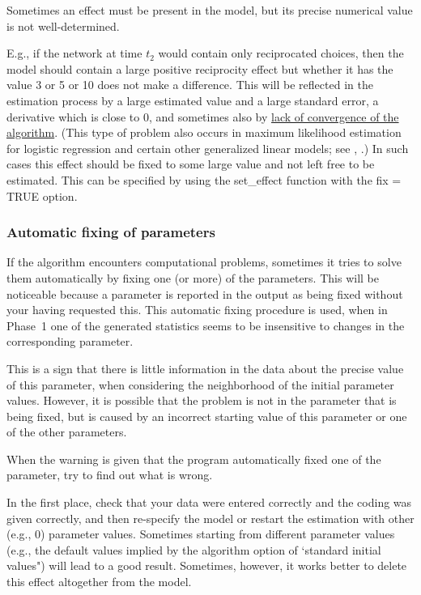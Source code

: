 \documentclass[a4paper,fleqn,11pt]{article}
\newcommand{\+}{\, + \,}
\begin{document}
\hypertarget{T_fix}{Sometimes an effect must be present in the
model, but its precise numerical value is not well-determined.}
E.g., if the network at time $t_2$ would contain only reciprocated
choices, then the model should contain a large positive
reciprocity effect but whether it has the value 3 or 5 or 10 does
not make a difference. This will be reflected in the estimation
process by a large estimated value and a large standard error, a
derivative which is close to 0, and sometimes also by
\hyperlink{T_convergence}{lack of convergence of the algorithm}.
(This type of problem also occurs in maximum likelihood estimation
for logistic regression and certain other generalized linear
models; \label{LargeFix} see \citet[section 1.6]{GeyerThompson92},
\citet{AlbertAnderson84, HauckDonner77}.)
In such cases this effect
should be fixed to some large value and not left free to be
estimated. This can be specified
by using the \textsf{set\_effect} function with the
\textsf{fix = TRUE} option.



\subsubsection{Automatic fixing of parameters}
\label{S_fixing}

If the algorithm encounters computational
problems, sometimes it tries to solve them automatically by fixing
one (or more) of the parameters. This will be noticeable because a
parameter is reported in the output as being fixed without your
having requested this. This automatic fixing procedure is used,
when in Phase~1 one of the generated statistics seems to be
insensitive to changes in the corresponding parameter.

This is a sign that there is little information in the data about
the precise value of this parameter, when considering the
neighborhood of the initial parameter values. However, it is
possible that the problem is not in the parameter that is being
fixed, but is caused by an incorrect starting value of this
parameter or one of the other parameters.

When the warning is given that the program automatically fixed one
of the parameter, try to find out what is wrong.

In the first place, check that your data were entered correctly
and the coding was given correctly, and then re-specify the model
or restart the estimation with other (e.g., 0) parameter values.
Sometimes starting from different parameter values (e.g., the
default values implied by the algorithm option
of `standard initial values") will lead to a good result.
Sometimes, however, it works better to delete this effect
altogether from the model.
\end{document}
